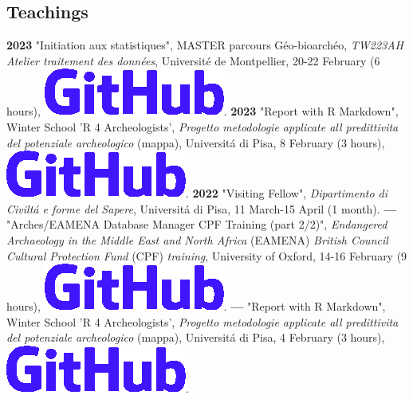 \documentclass{article}
\begin{document}
\subsection*{Teachings}

\textbf{2023 }"Initiation aux statistiques", MASTER parcours Géo-bioarchéo, \textit{TW223AH Atelier traitement des données}, Universit\'{e} de Montpellier, 20-22 February (6 hours), \href{https://github.com/zoometh/thomashuet/tree/main/profiles/oxford/R4A#readme}{\includegraphics[scale=0.12]{github-rect.png}}.
\smallbreak
\textbf{2023 }"Report with R Markdown", Winter School 'R 4 Archeologists', \textit{Progetto metodologie applicate all predittivita del potenziale archeologico} (mappa), Universit\'{a} di Pisa, 8 February (3 hours), \href{https://github.com/zoometh/thomashuet/tree/main/profiles/oxford/R4A#readme}{\includegraphics[scale=0.12]{github-rect.png}}.
\smallbreak
\textbf{2022 }"Visiting Fellow", \textit{Dipartimento di Civilt\'{a} e forme del Sapere}, Universit\'{a} di Pisa, 11 March-15 April (1 month).
\smallbreak
\textbf{--- }"Arches/EAMENA Database Manager CPF Training (part 2/2)", \textit{Endangered Archaeology in the Middle East and North Africa} (EAMENA) \textit{British Council Cultural Protection Fund} (CPF) \textit{training}, University of Oxford, 14-16 February (9 hours), \href{https://github.com/eamena-oxford/eamena-arches-dev/tree/main/training#readme}{\includegraphics[scale=0.12]{github-rect.png}}.
\smallbreak
\textbf{--- }"Report with R Markdown", Winter School 'R 4 Archeologists', \textit{Progetto metodologie applicate all predittivita del potenziale archeologico} (mappa), Universit\'{a} di Pisa, 4 February (3 hours), \href{https://github.com/zoometh/thomashuet/tree/main/profiles/oxford/R4A#readme}{\includegraphics[scale=0.12]{github-rect.png}}.
\end{document}
